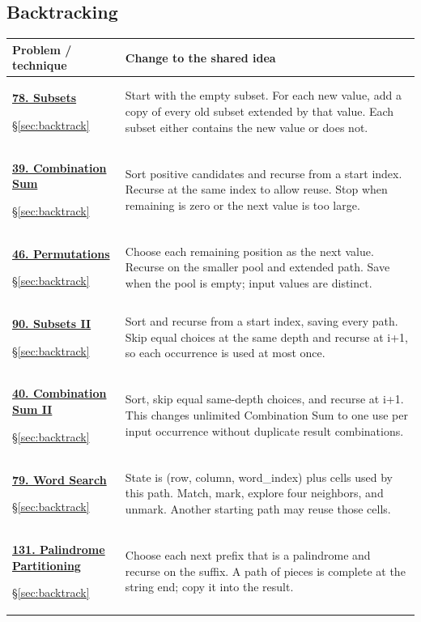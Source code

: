 \documentclass[11pt]{article}
\newcommand{\sect}[1]{\hyperref[sec:#1]{\S\ref*{sec:#1}}}
\begin{document}
\subsection{Backtracking}
\begin{longtable}{@{}L{4.3cm}L{11.7cm}@{}}
\toprule Problem / technique & Change to the shared idea \\ \midrule\endhead
\hypertarget{lc78}{}\href{https://leetcode.com/problems/subsets/}{\textbf{78. Subsets}}\par\sect{backtrack} & Start with the empty subset. For each new value, add a copy of every old subset extended by that value. Each subset either contains the new value or does not.\\[4pt]
\hypertarget{lc39}{}\href{https://leetcode.com/problems/combination-sum/}{\textbf{39. Combination Sum}}\par\sect{backtrack} & Sort positive candidates and recurse from a start index. Recurse at the same index to allow reuse. Stop when remaining is zero or the next value is too large.\\[4pt]
\hypertarget{lc46}{}\href{https://leetcode.com/problems/permutations/}{\textbf{46. Permutations}}\par\sect{backtrack} & Choose each remaining position as the next value. Recurse on the smaller pool and extended path. Save when the pool is empty; input values are distinct.\\[4pt]
\hypertarget{lc90}{}\href{https://leetcode.com/problems/subsets-ii/}{\textbf{90. Subsets II}}\par\sect{backtrack} & Sort and recurse from a start index, saving every path. Skip equal choices at the same depth and recurse at i+1, so each occurrence is used at most once.\\[4pt]
\hypertarget{lc40}{}\href{https://leetcode.com/problems/combination-sum-ii/}{\textbf{40. Combination Sum II}}\par\sect{backtrack} & Sort, skip equal same-depth choices, and recurse at i+1. This changes unlimited Combination Sum to one use per input occurrence without duplicate result combinations.\\[4pt]
\hypertarget{lc79}{}\href{https://leetcode.com/problems/word-search/}{\textbf{79. Word Search}}\par\sect{backtrack} & State is (row, column, word\_index) plus cells used by this path. Match, mark, explore four neighbors, and unmark. Another starting path may reuse those cells.\\[4pt]
\hypertarget{lc131}{}\href{https://leetcode.com/problems/palindrome-partitioning/}{\textbf{131. Palindrome Partitioning}}\par\sect{backtrack} & Choose each next prefix that is a palindrome and recurse on the suffix. A path of pieces is complete at the string end; copy it into the result.\\[4pt]

\end{longtable}
\end{document}
